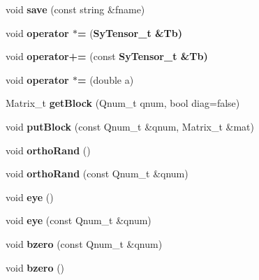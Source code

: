 \begin{CompactItemize}
\item 
void \textbf{save} (const string \&fname)\label{d1/d9f/classSyTensor__t_dfee275ff906680a7e9565bb951ff577}

\item 
void \textbf{operator $\ast$=} (\bf{Sy\-Tensor\_\-t} \&Tb)\label{d1/d9f/classSyTensor__t_bb5a70b83ec528a1d5457335e6b61c51}

\item 
void \textbf{operator+=} (const \bf{Sy\-Tensor\_\-t} \&Tb)\label{d1/d9f/classSyTensor__t_2ae18259182f7ca223f6c64e51062ebf}

\item 
void \textbf{operator $\ast$=} (double a)\label{d1/d9f/classSyTensor__t_83264355c3b1258c65978d366a1f0f74}

\item 
Matrix\_\-t \textbf{get\-Block} (Qnum\_\-t qnum, bool diag=false)\label{d1/d9f/classSyTensor__t_7166ab1f320b58356312c2fc20444344}

\item 
void \textbf{put\-Block} (const Qnum\_\-t \&qnum, Matrix\_\-t \&mat)\label{d1/d9f/classSyTensor__t_f2c4981608d27f22e3149f75a200a1fe}

\item 
void \textbf{ortho\-Rand} ()\label{d1/d9f/classSyTensor__t_d69ebcd87746a6b22b80955fef6c9981}

\item 
void \textbf{ortho\-Rand} (const Qnum\_\-t \&qnum)\label{d1/d9f/classSyTensor__t_b00d3203ffaebdebfef7b1a4e03ddb23}

\item 
void \textbf{eye} ()\label{d1/d9f/classSyTensor__t_d9617162f6007362376ba20ba9124683}

\item 
void \textbf{eye} (const Qnum\_\-t \&qnum)\label{d1/d9f/classSyTensor__t_d91a5d0fa2452a1ef27ee7ff252b42b3}

\item 
void \textbf{bzero} (const Qnum\_\-t \&qnum)\label{d1/d9f/classSyTensor__t_7cffbf45f93542bf4e06ca6e6f4d5ceb}

\item 
void \textbf{bzero} ()\label{d1/d9f/classSyTensor__t_83a256dd3fcad6be5bab21f53d4e5985}

\end{CompactItemize}
